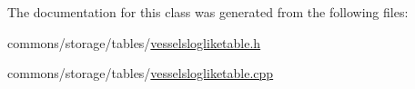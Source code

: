 The documentation for this class was generated from the following files\+:\begin{DoxyCompactItemize}
\item 
commons/storage/tables/\mbox{\hyperlink{vesselslogliketable_8h}{vesselslogliketable.\+h}}\item 
commons/storage/tables/\mbox{\hyperlink{vesselslogliketable_8cpp}{vesselslogliketable.\+cpp}}\end{DoxyCompactItemize}

